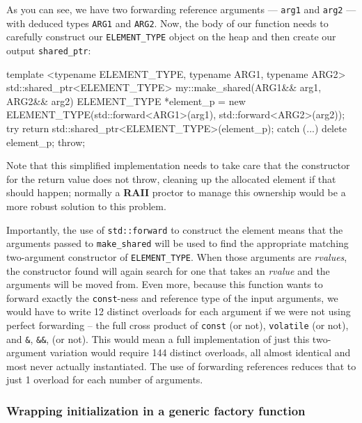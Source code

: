 \noindent As you can see, we have two forwarding reference arguments ---
\texttt{arg1} and \texttt{arg2} --- with deduced types \texttt{ARG1} and
\texttt{ARG2}. Now, the body of our function needs to carefully
construct our \texttt{ELEMENT\_TYPE} object on the heap and then create
our output \texttt{shared\_ptr}:

\begin{emcppslisting}[emcppsbatch=e9]
template <typename ELEMENT_TYPE, typename ARG1, typename ARG2>
std::shared_ptr<ELEMENT_TYPE> my::make_shared(ARG1&& arg1, ARG2&& arg2)
{
    ELEMENT_TYPE *element_p = new ELEMENT_TYPE(std::forward<ARG1>(arg1),
                                               std::forward<ARG2>(arg2));
    try
    {
        return std::shared_ptr<ELEMENT_TYPE>(element_p);
    }
    catch (...)
    {
        delete element_p;
        throw;
    }
}
\end{emcppslisting}

\noindent Note that this simplified implementation needs to take care that the
constructor for the return value does not throw, cleaning up the
allocated element if that should happen; normally a \textbf{RAII}
proctor to manage this ownership would be a more robust solution to this
problem.

Importantly, the use of \texttt{std::forward} to construct the element
means that the arguments passed to \texttt{make\_shared} will be used to
find the appropriate matching two-argument constructor of
\texttt{ELEMENT\_TYPE}. When those arguments are \emph{rvalues}, the
constructor found will again search for one that takes an \emph{rvalue}
and the arguments will be moved from. Even more, because this function
wants to forward exactly the \texttt{const}-ness and reference type of
the input arguments, we would have to write 12 distinct overloads for
each argument if we were not using perfect forwarding -- the full cross
product of \texttt{const} (or not), \texttt{volatile} (or not), and
\texttt{\&}, \texttt{\&\&}, (or not). This would mean a full
implementation of just this two-argument variation would require 144
distinct overloads, all almost identical and most never actually
instantiated. The use of forwarding references reduces that to just 1
overload for each number of arguments.

\subsubsection[Wrapping initialization in a generic factory function]{Wrapping initialization in a generic factory function}\label{wrapping-initialization-in-a-generic-factory-function}

